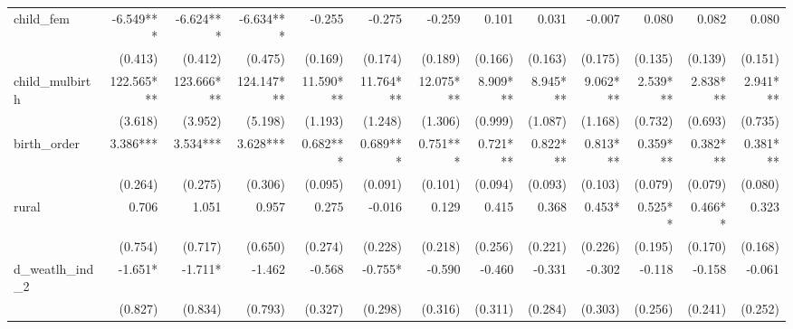 \begin{tabular}{lrrrrrrrrrrrr}
child\_fem                                  &    -6.549*** &    -6.624*** &    -6.634*** &       -0.255 &       -0.275 &       -0.259 &        0.101 &        0.031 &       -0.007 &        0.080 &        0.082 &        0.080 \\ 
                                            &      (0.413) &      (0.412) &      (0.475) &      (0.169) &      (0.174) &      (0.189) &      (0.166) &      (0.163) &      (0.175) &      (0.135) &      (0.139) &      (0.151) \\ 
child\_mulbirth                             &   122.565*** &   123.666*** &   124.147*** &    11.590*** &    11.764*** &    12.075*** &     8.909*** &     8.945*** &     9.062*** &     2.539*** &     2.838*** &     2.941*** \\ 
                                            &      (3.618) &      (3.952) &      (5.198) &      (1.193) &      (1.248) &      (1.306) &      (0.999) &      (1.087) &      (1.168) &      (0.732) &      (0.693) &      (0.735) \\ 
birth\_order                                &     3.386*** &     3.534*** &     3.628*** &     0.682*** &     0.689*** &     0.751*** &     0.721*** &     0.822*** &     0.813*** &     0.359*** &     0.382*** &     0.381*** \\ 
                                            &      (0.264) &      (0.275) &      (0.306) &      (0.095) &      (0.091) &      (0.101) &      (0.094) &      (0.093) &      (0.103) &      (0.079) &      (0.079) &      (0.080) \\ 
rural                                       &        0.706 &        1.051 &        0.957 &        0.275 &       -0.016 &        0.129 &        0.415 &        0.368 &       0.453* &      0.525** &      0.466** &        0.323 \\ 
                                            &      (0.754) &      (0.717) &      (0.650) &      (0.274) &      (0.228) &      (0.218) &      (0.256) &      (0.221) &      (0.226) &      (0.195) &      (0.170) &      (0.168) \\ 
d\_weatlh\_ind\_2                           &      -1.651* &      -1.711* &       -1.462 &       -0.568 &      -0.755* &       -0.590 &       -0.460 &       -0.331 &       -0.302 &       -0.118 &       -0.158 &       -0.061 \\ 
                                            &      (0.827) &      (0.834) &      (0.793) &      (0.327) &      (0.298) &      (0.316) &      (0.311) &      (0.284) &      (0.303) &      (0.256) &      (0.241) &      (0.252) \\ 

\end{tabular}

